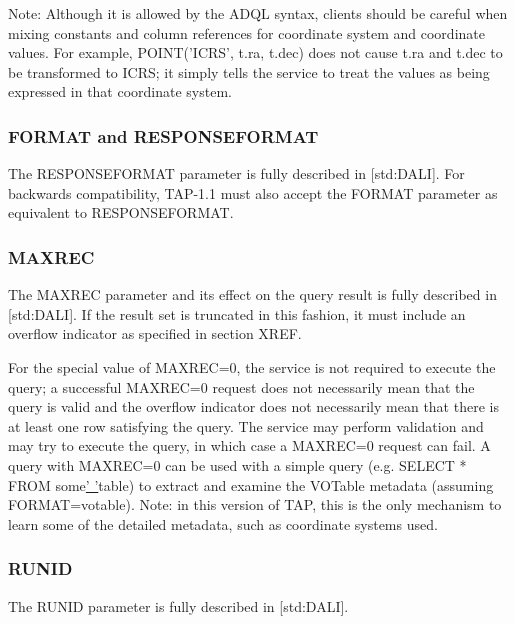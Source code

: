 \documentclass[11pt,a4paper]{ivoa}
\begin{document}
Note: Although it is allowed by the ADQL syntax, clients should be careful when 
mixing constants and column references for coordinate system and coordinate 
values. For example, POINT('ICRS', t.ra, t.dec) does not cause t.ra and t.dec to 
be transformed to ICRS; it simply tells the service to treat the values  as 
being expressed in that coordinate system.

\subsubsection{FORMAT and RESPONSEFORMAT}
The RESPONSEFORMAT parameter is fully described in [std:DALI]. For backwards 
compatibility, TAP-1.1 must also accept the FORMAT parameter as equivalent to 
RESPONSEFORMAT.

\subsubsection{MAXREC}
The MAXREC parameter and its effect on the query result is fully described in 
[std:DALI]. If the result set is truncated in this fashion, it must include an 
overflow indicator as specified in section XREF.

For the special value of MAXREC=0, the service is not required to execute the 
query; a successful  MAXREC=0 request does not necessarily mean that the query 
is valid and the overflow indicator does not necessarily mean that there is at 
least one row satisfying the query. The service may perform validation and may 
try to execute the query, in which case a MAXREC=0 request can fail. A query 
with MAXREC=0 can be used with a simple query (e.g. SELECT * FROM  
some\underline{' '}table) to extract and examine the VOTable metadata (assuming 
FORMAT=votable). Note: in this version of TAP, this is the only mechanism to 
learn some of the detailed metadata, such as coordinate systems used.

\subsubsection{RUNID}
The RUNID parameter is fully described in [std:DALI].
\end{document}
